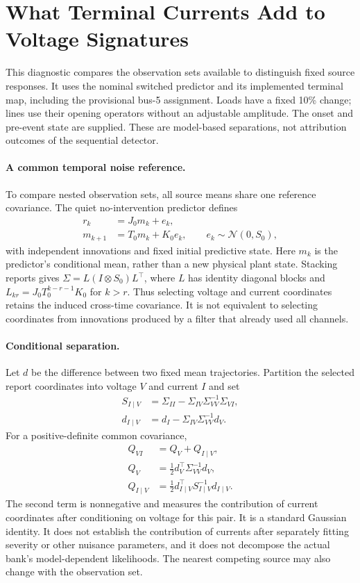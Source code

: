 \section{What Terminal Currents Add to Voltage Signatures}
\label{sec:channel-information}

This diagnostic compares the observation sets available to distinguish
fixed source responses. It uses the nominal switched predictor and its
implemented terminal map, including the provisional bus-5 assignment.
Loads have a fixed 10\% change; lines use their opening operators without
an adjustable amplitude. The onset and pre-event state are supplied.
These are model-based separations, not attribution outcomes of the
sequential detector.

\paragraph{A common temporal noise reference.}
To compare nested observation sets, all source means share one reference
covariance. The quiet no-intervention predictor defines
\begin{align}
 r_k&=J_0 m_k+e_k,\\
 m_{k+1}&=T_0m_k+K_0e_k,
 \qquad e_k\sim\mathcal N(0,S_0),
\end{align}
with independent innovations and fixed initial predictive state.
Here $m_k$ is the predictor's conditional mean, rather than a new
physical plant state. Stacking reports gives
$\Sigma=L(I\otimes S_0)L^\top$, where $L$ has identity diagonal blocks and
$L_{kr}=J_0T_0^{k-r-1}K_0$ for $k>r$.
Thus selecting voltage and current coordinates retains the induced
cross-time covariance. It is not equivalent to selecting coordinates
from innovations produced by a filter that already used all channels.

\paragraph{Conditional separation.}
Let $d$ be the difference between two fixed mean trajectories. Partition
the selected report coordinates into voltage $V$ and current $I$ and set
\begin{align}
 S_{I\mid V}&=\Sigma_{II}-\Sigma_{IV}\Sigma_{VV}^{-1}\Sigma_{VI},\\
 d_{I\mid V}&=d_I-\Sigma_{IV}\Sigma_{VV}^{-1}d_V.
\end{align}
For a positive-definite common covariance,
\begin{align}
 Q_{VI}&=Q_V+Q_{I\mid V},\\
 Q_V&=\tfrac12d_V^\top\Sigma_{VV}^{-1}d_V,\\
 Q_{I\mid V}&=\tfrac12d_{I\mid V}^\top S_{I\mid V}^{-1}d_{I\mid V}.
\end{align}
The second term is nonnegative and measures the contribution of current
coordinates after conditioning on voltage for this pair. It is a
standard Gaussian identity. It does not establish the contribution
of currents after separately fitting severity or other nuisance
parameters, and it does not decompose the actual bank's model-dependent
likelihoods. The nearest competing source may also change with the
observation set.


